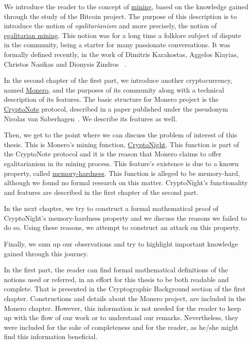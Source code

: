 We introduce the reader to the concept of \hyperref[sec:mining]{mining}, based on the knowledge gained through the study of the Bitcoin project. The purpose of this description is to introduce the notion of \emph{egalitarianism} and more precisely, the notion of \hyperref[sec:egalitarian]{egalitarian mining}. This notion was for a long time a folklore subject of dispute in the community, being a starter for many passionate conversations. It was formally defined recently, in the work of Dimitris Karakostas, Aggelos Kiayias, Christos Nasikas and Dionysis Zindros ~\cite{egalitarianism}.

In the second chapter of the first part, we introduce another cryptocurrency, named \hyperref[sec:Monero]{Monero}, and the purposes of its community along with a technical description of its features. The basic structure for Monero project is the \hyperref[sec:CryptoNote]{CryptoNote} protocol, described in a paper published under the pseudonym Nicolas van Saberhagen~\cite{citeulike:14139412}. We describe its features as well.

Then, we get to the point where we can discuss the problem of interest of this thesis. This is Monero's mining function, \hyperref[ch:cryptonight]{CryptoNight}. This function is part of the CryptoNote protocol and it is the reason that Monero claims to offer egalitarianism in its mining process. This feature's existence is due to a known property, called \hyperref[sec:memory-hard]{memory-hardness}. This function is alleged to be memory-hard, although we found no formal research on this matter. CryptoNight's functionality and features are described in the first chapter of the second part.

In the next chapter, we try to construct a formal mathematical proof of CryptoNight's memory-hardness property and we discuss the reasons we failed to do so. Using these reasons, we attempt to construct an attack on this property.

Finally, we sum up our observations and try to highlight important knowledge gained through this journey.

In the first part, the reader can find formal mathematical definitions of the notions used or referred, in an effort for this thesis to be both readable and complete. That is presented in the Cryptographic Background section of the first chapter. Constructions and details about the Monero project, are included in the Monero chapter. However, this information is not needed for the reader to keep up with the flow of our work or to understand our remarks. Nevertheless, they were included for the sake of completeness and for the reader, as he/she might find this information beneficial.
